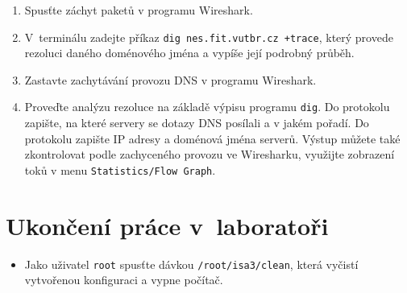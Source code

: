 \documentclass[a4paper,11pt]{article}
\begin{document}
\begin{enumerate}
  \item Spusťte záchyt paketů v programu Wireshark.
  
  \item V~terminálu zadejte příkaz \texttt{dig nes.fit.vutbr.cz +trace}, který provede rezoluci daného doménového jména a vypíše  její podrobný průběh. 
  
  \item Zastavte zachytávání provozu DNS v programu Wireshark.

  \item Proveďte analýzu rezoluce na základě výpisu programu {\tt dig}. Do protokolu zapište, na které servery se dotazy DNS posílali a v jakém pořadí. Do protokolu zapište IP adresy a doménová jména serverů. Výstup můžete také zkontrolovat podle zachyceného provozu ve Wiresharku, využijte zobrazení toků v menu {\tt Statistics/Flow Graph}. 

\end{enumerate}

\section{Ukončení práce v~laboratoři}
\begin{itemize}
  \item Jako uživatel {\tt root} spusťte dávkou {\tt /root/isa3/clean}, která vyčistí vytvořenou konfiguraci a vypne počítač.
\end{itemize}
\end{document}
